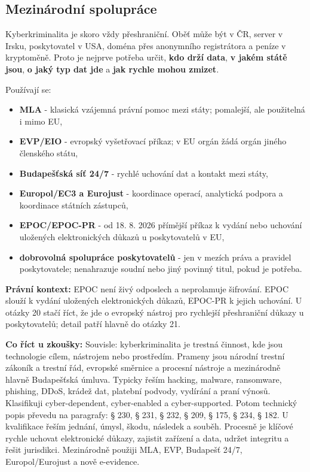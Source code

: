 \documentclass[11pt,a4paper]{article}
\newcommand{\zkouska}[1]{\begin{tcolorbox}[breakable,enhanced,colback=blue!7,colframe=blue!30!black,boxrule=0pt,arc=1mm,left=5pt,right=5pt,top=5pt,bottom=5pt,before skip=6pt,after skip=6pt]\textbf{Co říct u zkoušky:} #1\end{tcolorbox}}
\newcommand{\pravobox}[1]{\begin{tcolorbox}[breakable,enhanced,colback=yellow!18,colframe=yellow!45!black,boxrule=0pt,arc=1mm,left=5pt,right=5pt,top=5pt,bottom=5pt,before skip=6pt,after skip=6pt]\textbf{Právní kontext:} #1\end{tcolorbox}}
\begin{document}
\subsection*{Mezinárodní spolupráce}
Kyberkriminalita je skoro vždy přeshraniční. Oběť může být v ČR, server v Irsku, poskytovatel v USA, doména přes anonymního registrátora a peníze v kryptoměně. Proto je nejprve potřeba určit, \textbf{kdo drží data}, \textbf{v jakém státě jsou}, \textbf{o jaký typ dat jde} a \textbf{jak rychle mohou zmizet}.

Používají se:
\begin{itemize}
  \item \textbf{MLA} - klasická vzájemná právní pomoc mezi státy; pomalejší, ale použitelná i mimo EU,
  \item \textbf{EVP/EIO} - evropský vyšetřovací příkaz; v EU orgán žádá orgán jiného členského státu,
  \item \textbf{Budapešťská síť 24/7} - rychlé uchování dat a kontakt mezi státy,
  \item \textbf{Europol/EC3 a Eurojust} - koordinace operací, analytická podpora a koordinace státních zástupců,
  \item \textbf{EPOC/EPOC-PR} - od 18. 8. 2026 přímější příkaz k vydání nebo uchování uložených elektronických důkazů u poskytovatelů v EU,
  \item \textbf{dobrovolná spolupráce poskytovatelů} - jen v mezích práva a pravidel poskytovatele; nenahrazuje soudní nebo jiný povinný titul, pokud je potřeba.
\end{itemize}

\pravobox{EPOC není živý odposlech a neprolamuje šifrování. EPOC slouží k vydání uložených elektronických důkazů, EPOC-PR k jejich uchování. U otázky 20 stačí říct, že jde o evropský nástroj pro rychlejší přeshraniční důkazy u poskytovatelů; detail patří hlavně do otázky 21.}

\zkouska{Souvisle: kyberkriminalita je trestná činnost, kde jsou technologie cílem, nástrojem nebo prostředím. Prameny jsou národní trestní zákoník a trestní řád, evropské směrnice a procesní nástroje a mezinárodně hlavně Budapešťská úmluva. Typicky řeším hacking, malware, ransomware, phishing, DDoS, krádež dat, platební podvody, vydírání a praní výnosů. Klasifikuji cyber-dependent, cyber-enabled a cyber-supported. Potom technický popis převedu na paragrafy: § 230, § 231, § 232, § 209, § 175, § 234, § 182. U kvalifikace řeším jednání, úmysl, škodu, následek a souběh. Procesně je klíčové rychle uchovat elektronické důkazy, zajistit zařízení a data, udržet integritu a řešit jurisdikci. Mezinárodně použiji MLA, EVP, Budapešť 24/7, Europol/Eurojust a nově e-evidence.}
\end{document}
